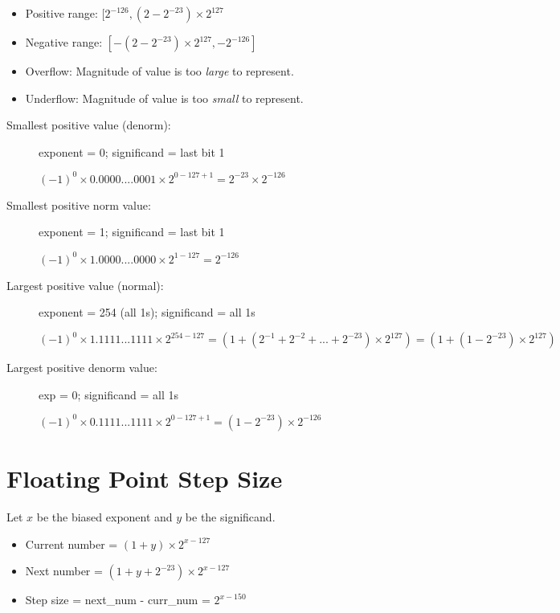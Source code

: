 \begin{itemize}
    \item Positive range: \([2^{-126}, (2 - 2^{-23}) \times 2^{127}\)
    \item Negative range: \([-(2 - 2^{-23}) \times 2^{127}, -2^{-126}]\)
    \item Overflow: Magnitude of value is too \emph{large} to represent.
    \item Underflow: Magnitude of value is too \emph{small} to represent.
\end{itemize}

\begin{description}
    \item[Smallest positive value (denorm):] exponent = 0; significand = last bit 1
    
    \((-1)^0 \times 0.0000....0001 \times 2^{0 - 127 + 1} = 2^{-23} \times 2^{-126}\)
    
    \item[Smallest positive norm value:] exponent = 1; significand = last bit 1
    
    \((-1)^0 \times 1.0000....0000 \times 2^{1-127} = 2^{-126}\) 
    
    \item[Largest positive value (normal):] exponent = 254 (all 1s); significand = all 1s
    
    \((-1)^0 \times 1.1111...1111 \times 2^{254 - 127} = (1 + (2^{-1} + 2^{-2} + ... + 2^{-23}) \times 2^{127}) = (1 + (1 - 2^{-23}) \times 2^{127})\)
    
    \item[Largest positive denorm value:] exp = 0; significand = all 1s
    
    \((-1)^0 \times 0.1111...1111 \times 2^{0 - 127 + 1} = (1 - 2^{-23}) \times 2^{-126}\)
\end{description}

\section{Floating Point Step Size}
Let $x$ be the biased exponent and $y$ be the significand. 
\begin{itemize}
    \item Current number = \((1+y) \times 2^{x - 127}\)
    \item Next number = \((1+y + 2^{-23}) \times 2^{x - 127}\)
    \item Step size = next\_num - curr\_num = \(2^{x-150}\)
\end{itemize}

